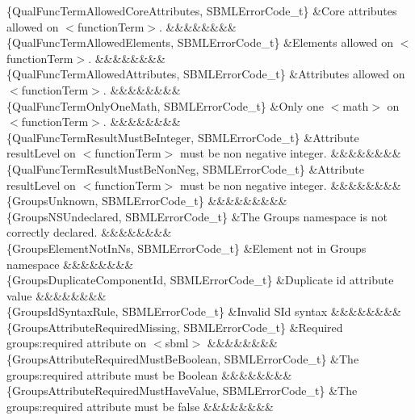 \begin{DoxyParagraph}{}
\begin{longtabu}
\{Qual\+Func\+Term\+Allowed\+Core\+Attributes, S\+B\+M\+L\+Error\+Code\+\_\+t\} &Core attributes allowed on {\ttfamily $<$function\+Term$>$}. &&&&&&&&\\
\{Qual\+Func\+Term\+Allowed\+Elements, S\+B\+M\+L\+Error\+Code\+\_\+t\} &Elements allowed on {\ttfamily $<$function\+Term$>$}. &&&&&&&&\\
\{Qual\+Func\+Term\+Allowed\+Attributes, S\+B\+M\+L\+Error\+Code\+\_\+t\} &Attributes allowed on {\ttfamily $<$function\+Term$>$}. &&&&&&&&\\
\{Qual\+Func\+Term\+Only\+One\+Math, S\+B\+M\+L\+Error\+Code\+\_\+t\} &Only one {\ttfamily $<$math$>$} on {\ttfamily $<$function\+Term$>$}. &&&&&&&&\\
\{Qual\+Func\+Term\+Result\+Must\+Be\+Integer, S\+B\+M\+L\+Error\+Code\+\_\+t\} &Attribute \textquotesingle{}result\+Level\textquotesingle{} on {\ttfamily $<$function\+Term$>$} must be non negative integer. &&&&&&&&\\
\{Qual\+Func\+Term\+Result\+Must\+Be\+Non\+Neg, S\+B\+M\+L\+Error\+Code\+\_\+t\} &Attribute \textquotesingle{}result\+Level\textquotesingle{} on {\ttfamily $<$function\+Term$>$} must be non negative integer. &&&&&&&&\\
\{Groups\+Unknown, S\+B\+M\+L\+Error\+Code\+\_\+t\} &&&&&&&&&\\
\{Groups\+N\+S\+Undeclared, S\+B\+M\+L\+Error\+Code\+\_\+t\} &The Groups namespace is not correctly declared. &&&&&&&&\\
\{Groups\+Element\+Not\+In\+Ns, S\+B\+M\+L\+Error\+Code\+\_\+t\} &Element not in Groups namespace &&&&&&&&\\
\{Groups\+Duplicate\+Component\+Id, S\+B\+M\+L\+Error\+Code\+\_\+t\} &Duplicate \textquotesingle{}id\textquotesingle{} attribute value &&&&&&&&\\
\{Groups\+Id\+Syntax\+Rule, S\+B\+M\+L\+Error\+Code\+\_\+t\} &Invalid S\+Id syntax &&&&&&&&\\
\{Groups\+Attribute\+Required\+Missing, S\+B\+M\+L\+Error\+Code\+\_\+t\} &Required groups\+:required attribute on {\ttfamily $<$sbml$>$} &&&&&&&&\\
\{Groups\+Attribute\+Required\+Must\+Be\+Boolean, S\+B\+M\+L\+Error\+Code\+\_\+t\} &The groups\+:required attribute must be Boolean &&&&&&&&\\
\{Groups\+Attribute\+Required\+Must\+Have\+Value, S\+B\+M\+L\+Error\+Code\+\_\+t\} &The groups\+:required attribute must be \textquotesingle{}false\textquotesingle{} &&&&&&&&\\

\end{longtabu}
\end{DoxyParagraph}
